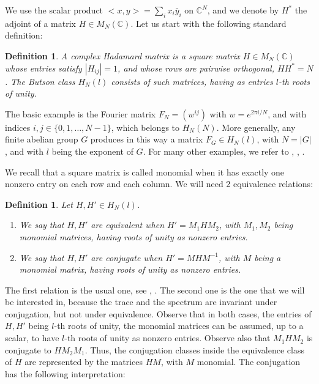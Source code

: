 \documentclass[11pt]{amsart}
\newtheorem{definition}[theorem]{Definition}
\theoremstyle{definition}
\begin{document}
We use the scalar product $<x,y>=\sum_ix_i\bar{y}_i$ on $\mathbb C^N$, and we denote by $H^*$ the adjoint of a matrix $H\in M_N(\mathbb C)$. Let us start with the following standard definition:

\begin{definition}
A complex Hadamard matrix is a square matrix $H\in M_N(\mathbb C)$ whose entries satisfy $|H_{ij}|=1$, and whose rows are pairwise orthogonal, $HH^*=N$. The Butson class $H_N(l)$ consists of such matrices, having as entries $l$-th roots of unity.
\end{definition}

The basic example is the Fourier matrix $F_N=(w^{ij})$ with $w=e^{2\pi i/N}$, and with indices $i,j\in\{0,1,\ldots,N-1\}$, which belongs to $H_N(N)$. More generally, any finite abelian group $G$ produces in this way a matrix $F_G\in H_N(l)$, with $N=|G|$, and with $l$ being the exponent of $G$. For many other examples, we refer to \cite{but}, \cite{haa}, \cite{tzy}.

\medskip

We recall that a square matrix is called monomial when it has exactly one nonzero entry on each row and each column. We will need 2 equivalence relations:

\begin{definition}\label{deqv}
Let $H,H'\in H_N(l)$.
\begin{enumerate}
\item We say that $H,H'$ are equivalent when $H'=M_1HM_2$, with $M_1,M_2$ being monomial matrices, having roots of unity as nonzero entries.

\item We say that $H,H'$ are conjugate when $H'=MHM^{-1}$, with $M$ being a monomial matrix, having roots of unity as nonzero entries.
\end{enumerate}
\end{definition}

The first relation is the usual one, see \cite{ost}, \cite{tzy}. The second one is the one that we will be interested in, because the trace and the spectrum are invariant under conjugation, but not under equivalence. Observe that in both cases, the entries of $H,H'$ being $l$-th roots of unity, the monomial matrices can be assumed, up to a scalar, to have $l$-th roots of unity as nonzero entries. Observe also that $M_1HM_2$ is conjugate to $HM_2M_1$. Thus, the conjugation classes inside the equivalence class of $H$ are represented by the matrices $HM$, with $M$ monomial. The conjugation has the following interpretation:
\end{document}
